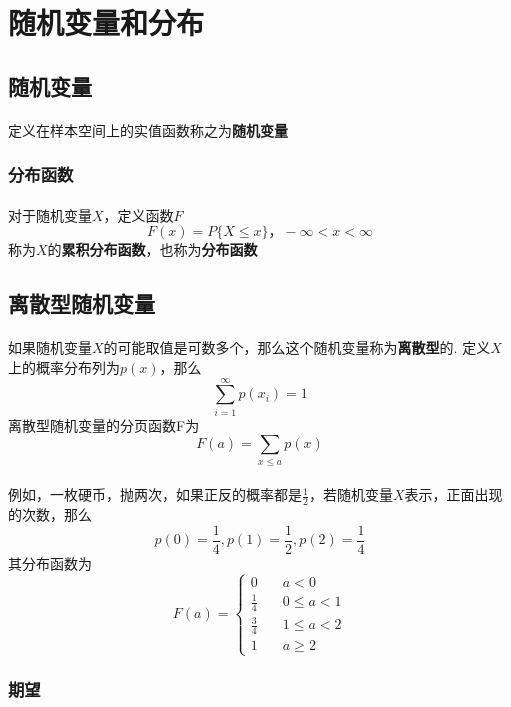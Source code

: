 \section{随机变量和分布}

\subsection{随机变量}
\paragraph{}
定义在样本空间上的实值函数称之为\textbf{随机变量}


\subsubsection{分布函数}
\paragraph{}
对于随机变量$X$，定义函数$F$
$$
F(x) = P\{X \leq x \}，-\infty < x < \infty
$$
称为$X$的\textbf{累积分布函数}，也称为\textbf{分布函数}

\subsection{离散型随机变量}
\paragraph{}
如果随机变量$X$的可能取值是可数多个，那么这个随机变量称为\textbf{离散型}的. 定义$X$上的概率分布列为$p(x)$，那么
$$
\sum_{i=1}^\infty p(x_i) = 1
$$
离散型随机变量的分页函数F为
$$
F(a) = \sum_{x \leq a} p(x)
$$

\paragraph{}
例如，一枚硬币，抛两次，如果正反的概率都是$\frac{1}{2}$，若随机变量$X$表示，正面出现的次数，那么
$$
p(0)= \frac{1}{4}, p(1) = \frac{1}{2}, p(2) = \frac{1}{4}
$$
其分布函数为
$$
F(a) =  \begin{cases}
0 & \quad a < 0 \\
\frac{1}{4} & \quad 0 \leq a < 1 \\
\frac{3}{4} & \quad 1 \leq a < 2 \\
1 & \quad a \geq 2
\end{cases}
$$

\subsubsection{期望}
